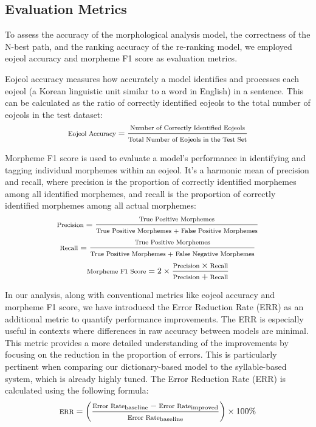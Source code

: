 \documentclass[AMS,STIX2COL]{WileyNJD-v2}
\begin{document}
    \subsection{Evaluation Metrics}\label{subsec:evaluation-metrics}

    To assess the accuracy of the morphological analysis model, the correctness of the N-best path, and the ranking accuracy of the re-ranking model, we employed eojeol accuracy and morpheme F1 score as evaluation metrics.

    Eojeol accuracy measures how accurately a model identifies and processes each eojeol (a Korean linguistic unit similar to a word in English) in a sentence.
    This can be calculated as the ratio of correctly identified eojeols to the total number of eojeols in the test dataset:
    \vspace{1mm}
    \[
        \footnotesize
        \text{Eojeol Accuracy} = \frac{\text{Number of Correctly Identified Eojeols}}{\text{Total Number of Eojeols in the Test Set}}
    \]
    \vspace{0.5mm}

    Morpheme F1 score is used to evaluate a model's performance in identifying and tagging individual morphemes within an eojeol.
    It's a harmonic mean of precision and recall, where precision is the proportion of correctly identified morphemes among all identified morphemes, and recall is the proportion of correctly identified morphemes among all actual morphemes:
    \vspace{1mm}
    \[
        \footnotesize
        \text{Precision} = \frac{\text{True Positive Morphemes}}{\text{True Positive Morphemes + False Positive Morphemes}}
    \]
    \vspace{1mm}
    \[
        \footnotesize
        \text{Recall} = \frac{\text{True Positive Morphemes}}{\text{True Positive Morphemes + False Negative Morphemes}}
    \]
    \vspace{1mm}
    \[
        \footnotesize
        \text{Morpheme F1 Score} = 2 \times \frac{\text{Precision} \times \text{Recall}}{\text{Precision} + \text{Recall}}
    \]
    \vspace{0.5mm}

    In our analysis, along with conventional metrics like eojeol accuracy and morpheme F1 score, we have introduced the Error Reduction Rate (ERR) as an additional metric to quantify performance improvements.
    The ERR is especially useful in contexts where differences in raw accuracy between models are minimal.
    This metric provides a more detailed understanding of the improvements by focusing on the reduction in the proportion of errors.
    This is particularly pertinent when comparing our dictionary-based model to the syllable-based system, which is already highly tuned.
    The Error Reduction Rate (ERR) is calculated using the following formula:
    \vspace{1mm}
    \[
        \footnotesize
        \text{ERR} = \left( \frac{\text{Error Rate}_{\text{baseline}} - \text{Error Rate}_{\text{improved}}}{\text{Error Rate}_{\text{baseline}}} \right) \times 100\%
    \]
    \vspace{0.5mm}
\end{document}

